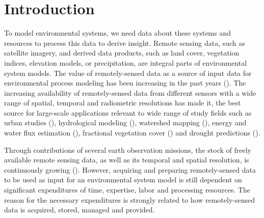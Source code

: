 \chapter{Introduction}


To model environmental systems, we need data about these systems  and resources to process this data to derive insight. Remote sensing data, such as satellite imagery, and derived data products, such as land cover, vegetation indices, elevation models, or precipitation, are integral parts of environmental system models. 
The value of remotely-sensed data as a source of input data for environmental process modeling has been increasing in the past years (\cite{melesse2007remote}). The increasing availability of remotely-sensed data from different sensors with a wide range of spatial, temporal and radiometric resolutions has made it, the best source for large-scale applications relevant to wide range of study fields such as urban studies (\cite{wu2000global}), hydrological modeling (\cite{bogh2004incorporating}), watershed mapping (\cite{melesse2003spatially}), energy and water flux estimation (\cite{melesse2005estimation}), fractional vegetation cover (\cite{carlson2000impact}) and drought predictions (\cite{rhee2010monitoring}).

Through contributions of several earth observation missions, the stock of freely available remote sensing data, as well as its temporal and spatial resolution, is continuously growing (\cite{melesse2007remote}).
However, acquiring and preparing remotely-sensed data to be used as input for an environmental system model is still dependent on significant expenditures of time, expertise, labor and processing resources. The reason for the necessary expenditures is strongly related to how remotely-sensed data is acquired, stored, managed and provided.

